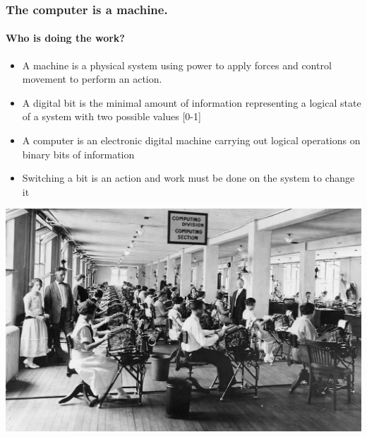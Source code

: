 \documentclass[unknownkeysallowed, 10pt, a4 paper, handout]{beamer}
\begin{document}
\begin{frame}[label=Computer]
  \frametitle{The computer is a machine.}
  \framesubtitle{Who is doing the work?}
  \begin{itemize}
   \item A machine is a physical system using power to apply forces and
       control movement to perform an action.
   \item A digital bit is the minimal amount of information representing
       a logical state of a system with two possible values [0-1]
   \item A computer is an electronic digital machine carrying out logical
       operations on binary bits of information
   \item Switching a bit is an action and work must be done on the system
       to change it
  \end{itemize}
  \begin{center}
    \includegraphics[scale=0.12]{pics/computers.png}
  \end{center}
\end{frame}
\end{document}
